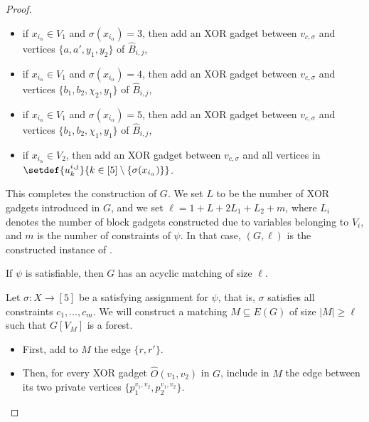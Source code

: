 \begin{proof}
\begin{itemize}
\begin{itemize}
                \item if $x_{i_\alpha} \in V_1$ and $\sigma(x_{i_\alpha}) = 3$,
                then add an XOR gadget between $v_{c,\sigma}$ and vertices $\{a, a',y_1, y_2\}$ of $\hat{B}_{i,j}$,

                \item if $x_{i_\alpha} \in V_1$ and $\sigma(x_{i_\alpha}) = 4$,
                then add an XOR gadget between $v_{c,\sigma}$ and vertices $\{b_1, b_2, \chi_2, y_1\}$ of $\hat{B}_{i,j}$,

                \item if $x_{i_\alpha} \in V_1$ and $\sigma(x_{i_\alpha}) = 5$,
                then add an XOR gadget between $v_{c,\sigma}$ and vertices $\{b_1, b_2, \chi_1, y_1\}$ of $\hat{B}_{i,j}$,

                \item if $x_{i_\alpha} \in V_2$,
                then add an XOR gadget between $v_{c,\sigma}$ and all vertices in $\setdef{u^{i,j}_k}{k \in [5] \setminus \{ \sigma(x_{i_\alpha}) \}}$.
            \end{itemize}
        \end{itemize}

        This completes the construction of $G$.
        We set $L$ to be the number of XOR gadgets introduced in $G$,
        and we set $\ell = 1 + L + 2L_1 + L_2 + m$,
        where $L_i$ denotes the number of block gadgets constructed due to variables belonging to $V_i$,
        and $m$ is the number of constraints of $\psi$.
        In that case, $(G,\ell)$ is the constructed instance of \AcyclicM.



        \begin{lemma}\label{lem:acyclic:lb:csp->acyclic}
            If $\psi$ is satisfiable,
            then $G$ has an acyclic matching of size $\ell$.
        \end{lemma}

        \begin{nestedproof}
            Let $\sigma \colon X \to [5]$ be a satisfying assignment for $\psi$, that is,
            $\sigma$ satisfies all constraints $c_1, \ldots, c_m$.
            We will construct a matching $M \subseteq E(G)$ of size $|M| \geq \ell$ such that $G[V_M]$ is a forest.
            \begin{itemize}
                \item First, add to $M$ the edge $\{r,r'\}$.

                \item Then, for every XOR gadget $\hat{O}(v_1,v_2)$ in $G$, include in $M$ the edge between
                its two private vertices $\{p^{v_1,v_2}_1,p^{v_1,v_2}_2\}$.


\end{itemize}
\end{nestedproof}
\end{proof}
